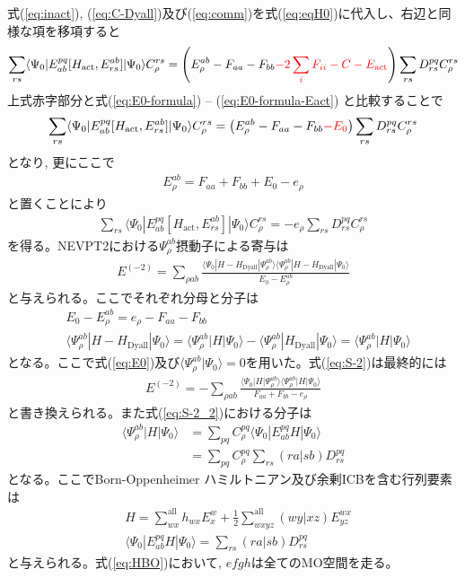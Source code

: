 \documentclass[11pt,pra,aps]{revtex4}
\newcommand{\red}[1]{\textcolor{red}{#1}}
\begin{document}
式(\ref{eq:inact}), (\ref{eq:C-Dyall})及び(\ref{eq:comm})を式(\ref{eq:eqH0})に代入し、右辺と同様な項を移項すると
\begin{align}
  \sum_{rs} \langle\Psi_0|E^{pq}_{ab}[H_\text{act},E_{rs}^{ab}]|\Psi_0\rangle C_\rho^{rs}=\left(E_{\rho}^{ab}-F_{aa}-F_{bb}\red{-2\sum_i F_{ii}-C-E_\text{act}}\right)\sum_{rs} D^{pq}_{rs} C_\rho^{rs} \label{eq:eqH0_2}
\end{align}
上式赤字部分と式(\ref{eq:E0-formula}) -- (\ref{eq:E0-formula-Eact}) と比較することで
\begin{align}
  \sum_{rs} \langle\Psi_0|E^{pq}_{ab}[H_\text{act},E_{rs}^{ab}]|\Psi_0\rangle C_\rho^{rs}=\left(E_{\rho}^{ab}-F_{aa}-F_{bb}\red{-E_0}\right)\sum_{rs} D^{pq}_{rs} C_\rho^{rs} \label{eq:eqH0_2}
\end{align}
となり, 更にここで
\begin{align}
  E_{\rho}^{ab}=F_{aa}+F_{bb}+E_0-e_\rho
\end{align}
と置くことにより
\begin{align}
  \sum_{rs} \langle\Psi_0|E^{pq}_{ab}[H_\text{act},E_{rs}^{ab}]|\Psi_0\rangle C_\rho^{rs}=-e_\rho\sum_{rs} D^{pq}_{rs} C_\rho^{rs} \label{eq:eqH0_3}
\end{align}
を得る。NEVPT2における$\Psi_\rho^{ab}$摂動子による寄与は
\begin{align}
  E^{(-2)}=\sum_{\rho ab} \frac{\langle\Psi_0|H-H_\text{Dyall}|\Psi_{\rho}^{ab}\rangle\langle\Psi_{\rho}^{ab}|H-H_\text{Dyall}|\Psi_0\rangle}{E_0-E_\rho^{ab}} \label{eq:S-2}
\end{align}
と与えられる。ここでそれぞれ分母と分子は
\begin{align}
  &E_0-E_{\rho}^{ab}=e_\rho-F_{aa}-F_{bb} \\
  &\langle\Psi_{\rho}^{ab}|H-H_\text{Dyall}|\Psi_0\rangle=\langle\Psi_{\rho}^{ab}|H|\Psi_0\rangle-\langle\Psi_{\rho}^{ab}|H_\text{Dyall}|\Psi_0\rangle=\langle\Psi_{\rho}^{ab}|H|\Psi_0\rangle \label{eq:num}
\end{align}
となる。ここで式(\ref{eq:E0})及び$\langle\Psi_{\rho}^{ab}|\Psi_0\rangle=0$を用いた。式(\ref{eq:S-2})は最終的には
\begin{align}
  E^{(-2)}=-\sum_{\rho ab} \frac{\langle\Psi_0|H|\Psi_{\rho}^{ab}\rangle\langle\Psi_{\rho}^{ab}|H|\Psi_0\rangle}{F_{aa}+F_{bb}-e_\rho} \label{eq:S-2_2}
\end{align}
と書き換えられる。また式(\ref{eq:S-2_2})における分子は
\begin{align}
  \langle\Psi_{\rho}^{ab}|H|\Psi_0\rangle&=\sum_{pq}C_\rho^{pq} \langle\Psi_0|E_{ab}^{pq}H|\Psi_0\rangle \nonumber \\
  &=\sum_{pq}C_\rho^{pq} \sum_{rs} (ra|sb) D^{pq}_{rs}
\end{align}
となる。ここでBorn-Oppenheimer ハミルトニアン及び余剰ICBを含む行列要素は
\begin{align}
  &H=\sum_{wx}^\text{all} h_{wx} E^w_x+\frac{1}{2}\sum_{wxyz}^\text{all} (wy|xz) E^{wx}_{yz} \label{eq:HBO} \\
  &\langle\Psi_0|E_{ab}^{pq}H|\Psi_0\rangle=\sum_{rs} (ra|sb) D^{pq}_{rs} \label{eq:numerator}
\end{align}
と与えられる。式(\ref{eq:HBO})において, $efgh$は全てのMO空間を走る。
\end{document}
